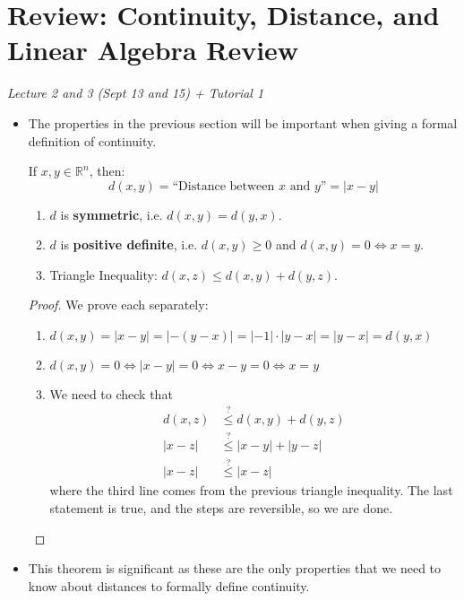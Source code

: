 \section{Review: Continuity, Distance, and Linear Algebra Review}
\textit{Lecture 2 and 3 (Sept 13 and 15) + Tutorial 1}
\begin{itemize}
    \item The properties in the previous section will be important when giving a formal definition of continuity.
          \begin{definition}
              If $x,y\in \mathbb{R}^n$, then:
              \begin{equation}
                  d(x,y) = \text{``Distance between $x$ and $y$''} = |x-y|
              \end{equation}
          \end{definition}
          \begin{theorem}
              \begin{enumerate}
                  \item $d$ is \textbf{symmetric}, i.e. $d(x,y)=d(y,x)$.
                  \item $d$ is \textbf{positive definite}, i.e. $d(x,y) \ge 0$ and $d(x,y)=0 \iff x=y$.
                  \item Triangle Inequality: $d(x,z) \le d(x,y) + d(y,z).$
              \end{enumerate}
          \end{theorem}
          \begin{proof}
              We prove each separately:
              \begin{enumerate}
                  \item $d(x,y) = |x-y| = |-(y-x)| = |-1| \cdot |y-x| = |y-x| = d(y,x)$
                  \item $d(x,y) = 0 \iff |x-y| = 0 \iff x-y = 0 \iff x=y$
                  \item We need to check that
                        \begin{align}
                            d(x,z) & \stackrel{?}{\le} d(x,y) + d(y,z) \\
                            |x-z|  & \stackrel{?}{\le} |x-y| + |y-z|   \\
                            |x-z|  & \stackrel{?}{\le} |x-z|
                        \end{align}
                        where the third line comes from the previous triangle inequality. The last statement is true, and the steps are reversible, so we are done.
              \end{enumerate}
          \end{proof}
    \item This theorem is significant as these are the only properties that we need to know about distances to formally define continuity.


\end{itemize}
